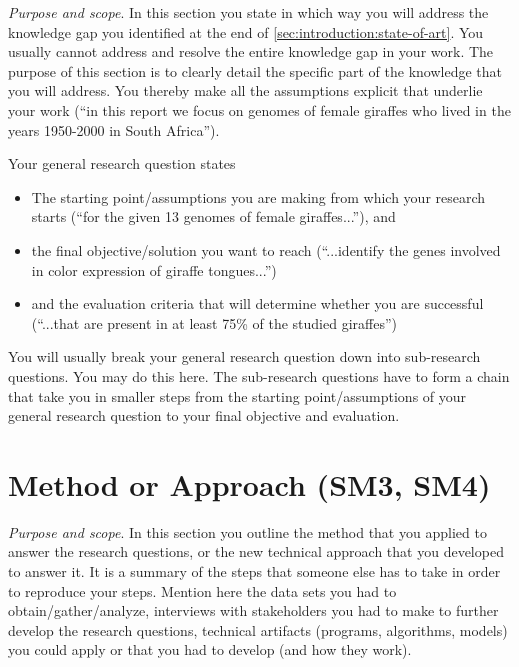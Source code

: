 \documentclass[
  numbers=noenddot,
  english,  %
  a4paper,  %
  twoside,  %
  bibliography=totoc,
  headsepline,
  cleardoublepage=empty,
  parskip=half,
  draft=false
]{scrbook}
\theoremstyle{break}
\begin{document}
\emph{Purpose and scope}.
In this section you state in which way you will address the knowledge gap you identified at the end of \cref{sec:introduction:state-of-art}.
You usually cannot address and resolve the entire knowledge gap in your work.
The purpose of this section is to clearly detail the specific part of the knowledge that you will address.
You thereby make all the assumptions explicit that underlie your work (``in this report we focus on genomes of female giraffes who lived in the years 1950-2000 in South Africa'').

Your general research question states
\begin{itemize}
  \item The starting point/assumptions you are making from which your research starts (``for the given 13 genomes of female giraffes...''), and
  \item the final objective/solution you want to reach (``...identify the genes involved in color expression of giraffe tongues...'')
  \item and the evaluation criteria that will determine whether you are successful (``...that are present in at least 75\% of the studied giraffes'')
\end{itemize}

You will usually break your general research question down into sub-research questions.
You may do this here.
The sub-research questions have to form a chain that take you in smaller steps from the starting point/assumptions of your general research question to your final objective and evaluation.

\section{Method or Approach (SM3, SM4)}\label{sec:introduction:method}

\emph{Purpose and scope}.
In this section you outline the method that you applied to answer the research questions, or the new technical approach that you developed to answer it.
It is a summary of the steps that someone else has to take in order to reproduce your steps.
Mention here the data sets you had to obtain/gather/analyze, interviews with stakeholders you had to make to further develop the research questions, technical artifacts (programs, algorithms, models) you could apply or that you had to develop (and how they work).
\end{document}
